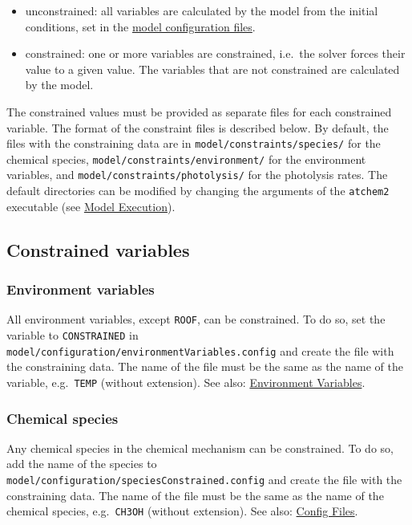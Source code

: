 \begin{itemize}
\item unconstrained: all variables are calculated by the model from
  the initial conditions, set in the \hyperref[sec:config]{model
    configuration files}.
\item constrained: one or more variables are constrained, i.e.~the
  solver forces their value to a given value. The variables that are
  not constrained are calculated by the model.
\end{itemize}

The constrained values must be provided as separate files for each
constrained variable. The format of the constraint files is described
below. By default, the files with the constraining data are in
\texttt{model/constraints/species/} for the chemical species,
\texttt{model/constraints/environment/} for the environment variables,
and \texttt{model/constraints/photolysis/} for the photolysis
rates. The default directories can be modified by changing the
arguments of the \texttt{atchem2} executable (see
\hyperref[subsec:execution]{Model Execution}).

\subsection{Constrained
  variables} \label{subsec:constrained-variables}

\subsubsection{Environment variables} \label{environment-variables}

All environment variables, except \texttt{ROOF}, can be
constrained. To do so, set the variable to \texttt{CONSTRAINED} in
\texttt{model/configuration/environmentVariables.config} and create
the file with the constraining data. The name of the file must be the
same as the name of the variable, e.g.~\texttt{TEMP} (without
extension). See also: \hyperref[sec:envvar]{Environment Variables}.

\subsubsection{Chemical species} \label{chemical-species}

Any chemical species in the chemical mechanism can be constrained. To
do so, add the name of the species to
\texttt{model/configuration/speciesConstrained.config} and create the
file with the constraining data. The name of the file must be the same
as the name of the chemical species, e.g.~\texttt{CH3OH} (without
extension). See also: \hyperref[sec:config]{Config Files}.

